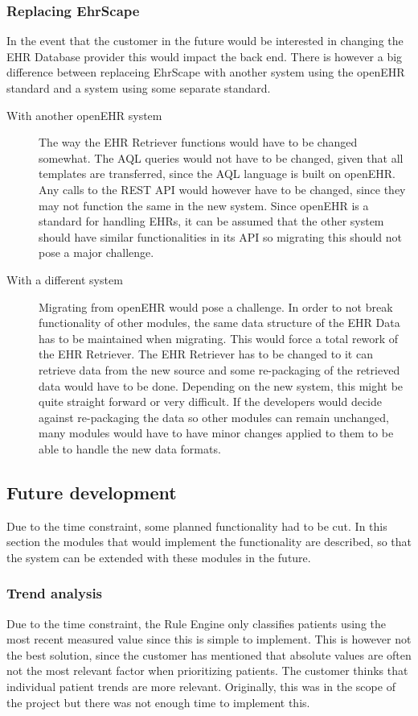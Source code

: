 \documentclass{article}
\begin{document}
\subsubsection{Replacing EhrScape}
In the event that the customer in the future would be interested in changing the EHR Database provider this would impact the back end. There is however a big difference between replaceing EhrScape with another system using the openEHR standard and a system using some separate standard.

\begin{description}
\item [With another openEHR system] The way the EHR Retriever functions would have to be changed somewhat. The AQL queries would not have to be changed, given that all templates are transferred, since the AQL language is built on openEHR. Any calls to the REST API would however have to be changed, since they may not function the same in the new system. Since openEHR is a standard for handling EHRs, it can be assumed that the other system should have similar functionalities in its API so migrating this should not pose a major challenge.

\item [With a different system] Migrating from openEHR would pose a challenge. In order to not break functionality of other modules, the same data structure of the EHR Data has to be maintained when migrating. This would force a total rework of the EHR Retriever. The EHR Retriever has to be changed to it can retrieve data from the new source and some re-packaging of the retrieved data would have to be done. Depending on the new system, this might be quite straight forward or very difficult. If the developers would decide against re-packaging the data so other modules can remain unchanged, many modules would have to have minor changes applied to them to be able to handle the new data formats.
\end{description}


\subsection{Future development}
Due to the time constraint, some planned functionality had to be cut. In this section the modules that would implement the functionality are described, so that the system can be extended with these modules in the future.


\subsubsection{Trend analysis}\label{trend-analysis}
Due to the time constraint, the Rule Engine only classifies patients using the most recent measured value since this is simple to implement. This is however not the best solution, since the customer has mentioned that absolute values are often not the most relevant factor when prioritizing patients. The customer thinks that individual patient trends are more relevant. Originally, this was in the scope of the project but there was not enough time to implement this. 
\end{document}
